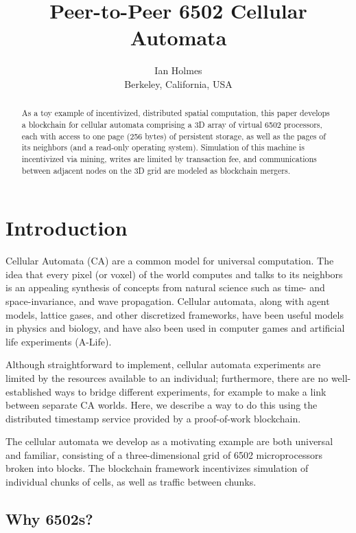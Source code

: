 \documentclass{article}
\begin{document}
\title{Peer-to-Peer 6502 Cellular Automata}
\author{Ian Holmes \\ Berkeley, California, USA}

\maketitle


\begin{abstract}
  As a toy example of incentivized, distributed spatial computation,
  this paper develops a blockchain for cellular automata
  comprising a 3D array of virtual 6502 processors, each with access to one page (256 bytes) of persistent storage,
  as well as the pages of its neighbors (and a read-only operating system).
  Simulation of this machine is incentivized via mining,
  writes are limited by transaction fee,
  and communications between adjacent nodes on the 3D grid are modeled as blockchain mergers.
\end{abstract}

\section{Introduction}

Cellular Automata (CA) are a common model for universal computation.
The idea that every pixel (or voxel) of the world computes and talks to its neighbors
is an appealing synthesis of concepts from natural science such as time- and space-invariance, and wave propagation.
Cellular automata, along with agent models, lattice gases, and other discretized frameworks, have been useful models in physics and biology,
and have also been used in computer games and artificial life experiments (A-Life).

Although straightforward to implement, cellular automata experiments are limited by the resources available to an individual;
furthermore, there are no well-established ways to bridge different experiments, for example to make a link between separate CA worlds.
Here, we describe a way to do this using the distributed timestamp service provided by a proof-of-work blockchain.

The cellular automata we develop as a motivating example are both universal and familiar, consisting of a three-dimensional grid of 6502 microprocessors broken into blocks.
The blockchain framework incentivizes simulation of individual chunks of cells, as well as traffic between chunks.

\subsection{Why 6502s?}
\end{document}
